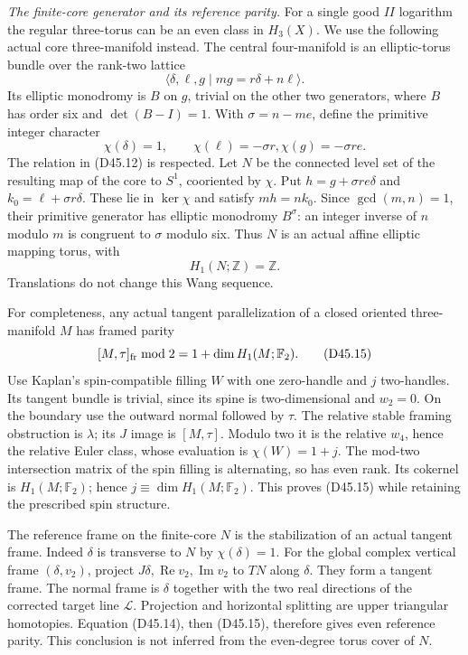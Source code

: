 \emph{The finite-core generator and its reference parity.}
For a single good $II$ logarithm the regular three-torus
can be an even class in $H_3(X)$. We use the following
actual core three-manifold instead. The central four-manifold
is an elliptic-torus bundle over the rank-two lattice
\[
 \langle\delta,\ell,g\mid mg=r\delta+n\ell\rangle.
                                                               \tag{D45.12}
\]
Its elliptic monodromy is $B$ on $g$, trivial on the other
two generators, where $B$ has order six and
$\det(B-I)=1$. With $\sigma=n-me$, define the primitive
integer character
\[
 \chi(\delta)=1,\qquad \chi(\ell)=-\sigma r,
                       \chi(g)=-\sigma re.                 \tag{D45.13}
\]
The relation in (D45.12) is respected. Let $N$ be the
connected level set of the resulting map of the core to
$S^1$, cooriented by $\chi$. Put
$h=g+\sigma re\delta$ and $k_0=\ell+\sigma r\delta$.
These lie in $\ker\chi$ and satisfy $mh=nk_0$.
Since $\gcd(m,n)=1$, their primitive generator has elliptic
monodromy $B^\sigma$: an integer inverse of $n$ modulo
$m$ is congruent to $\sigma$ modulo six. Thus $N$ is an
actual affine elliptic mapping torus, with
\[
                        H_1(N;\mathbb Z)=\mathbb Z.        \tag{D45.14}
\]
Translations do not change this Wang sequence.

For completeness, any actual tangent parallelization of
a closed oriented three-manifold $M$ has framed parity
\[
        [M,\tau]_{\rm fr}\bmod2
                    =1+\dim H_1(M;\mathbb F_2).             \tag{D45.15}
\]
Use Kaplan's spin-compatible filling $W$ with one zero-handle
and $j$ two-handles. Its tangent bundle is trivial, since
its spine is two-dimensional and $w_2=0$. On the boundary
use the outward normal followed by $\tau$.
The relative stable framing obstruction is $\lambda$;
its $J$ image is $[M,\tau]$. Modulo two it is the relative
$w_4$, hence the relative Euler class, whose evaluation is
$\chi(W)=1+j$. The mod-two intersection matrix of the
spin filling is alternating, so has even rank. Its
cokernel is $H_1(M;\mathbb F_2)$; hence
$j\equiv\dim H_1(M;\mathbb F_2)$. This proves (D45.15)
while retaining the prescribed spin structure.

The reference frame on the finite-core $N$ is the
stabilization of an actual tangent frame. Indeed $\delta$
is transverse to $N$ by $\chi(\delta)=1$. For the global
complex vertical frame $(\delta,v_2)$, project
$J\delta,\operatorname{Re}v_2,\operatorname{Im}v_2$ to $TN$
along $\delta$. They form a tangent frame. The normal
frame is $\delta$ together with the two real directions
of the corrected target line $\mathcal L$. Projection
and horizontal splitting are upper triangular homotopies.
Equation (D45.14), then (D45.15), therefore gives even
reference parity. This conclusion is not inferred from
the even-degree torus cover of $N$.

